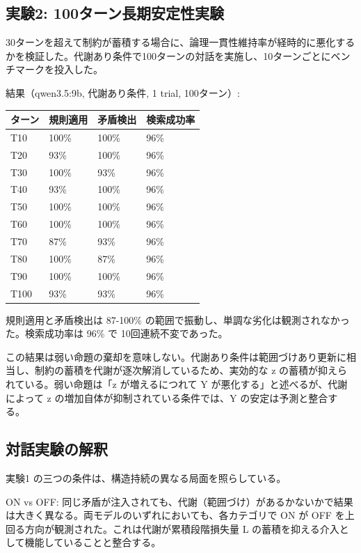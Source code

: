 \documentclass[12pt,a4paper]{article}
\begin{document}
\subsection{実験2: 100ターン長期安定性実験}\label{ux5b9fux9a132-100ux30bfux30fcux30f3ux9577ux671fux5b89ux5b9aux6027ux5b9fux9a13}

30ターンを超えて制約が蓄積する場合に、論理一貫性維持率が経時的に悪化するかを検証した。代謝あり条件で100ターンの対話を実施し、10ターンごとにベンチマークを投入した。

結果（qwen3.5:9b, 代謝あり条件, 1 trial, 100ターン）:

{\def\LTcaptype{table} %
\begin{longtable}[]{@{}llll@{}}
\toprule\noalign{}
ターン & 規則適用 & 矛盾検出 & 検索成功率 \\
\midrule\noalign{}
\endhead
\bottomrule\noalign{}
\endlastfoot
T10 & 100\% & 100\% & 96\% \\
T20 & 93\% & 100\% & 96\% \\
T30 & 100\% & 93\% & 96\% \\
T40 & 93\% & 100\% & 96\% \\
T50 & 100\% & 100\% & 96\% \\
T60 & 100\% & 100\% & 96\% \\
T70 & 87\% & 93\% & 96\% \\
T80 & 100\% & 87\% & 96\% \\
T90 & 100\% & 100\% & 96\% \\
T100 & 93\% & 93\% & 96\% \\
\end{longtable}
}

規則適用と矛盾検出は 87-100\% の範囲で振動し、単調な劣化は観測されなかった。検索成功率は 96\% で 10回連続不変であった。

この結果は弱い命題の棄却を意味しない。代謝あり条件は範囲づけあり更新に相当し、制約の蓄積を代謝が逐次解消しているため、実効的な z の蓄積が抑えられている。弱い命題は「z が増えるにつれて Y が悪化する」と述べるが、代謝によって z の増加自体が抑制されている条件では、Y の安定は予測と整合する。

\subsection{対話実験の解釈}\label{ux5bfeux8a71ux5b9fux9a13ux306eux89e3ux91c8}

実験1 の三つの条件は、構造持続の異なる局面を照らしている。

ON vs OFF: 同じ矛盾が注入されても、代謝（範囲づけ）があるかないかで結果は大きく異なる。両モデルのいずれにおいても、各カテゴリで ON が OFF を上回る方向が観測された。これは代謝が累積段階損失量 L の蓄積を抑える介入として機能していることと整合する。
\end{document}
